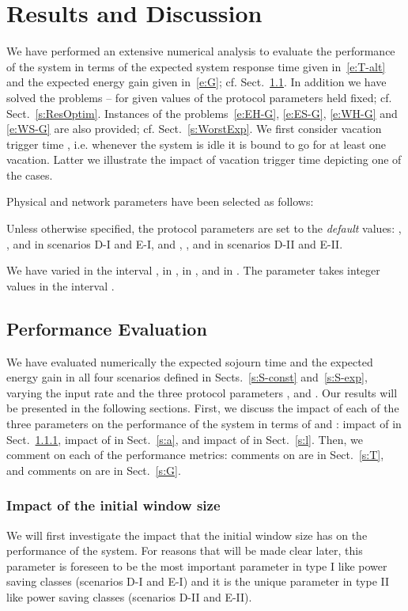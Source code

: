 \documentclass[journal]{IEEEtran}
\begin{document}
\section{Results and Discussion}
\label{s:res}
We have performed an extensive numerical analysis to evaluate the performance of the system in terms of the expected system response time  given in~\eqref{e:T-alt} and the expected energy gain  given in~\eqref{e:G}; cf. Sect.~\ref{s:ResPeva}. In addition we have solved the problems -- for given values of the protocol parameters held fixed; cf. Sect.~\ref{s:ResOptim}. Instances of the problems~\eqref{e:EH-G}, \eqref{e:ES-G}, \eqref{e:WH-G} and \eqref{e:WS-G} are also provided; cf. Sect.~\ref{s:WorstExp}. We first consider vacation trigger time , i.e. whenever the system is idle it is bound to go for at least one vacation. Latter we illustrate the impact of vacation trigger time depicting one of the cases.

Physical and network parameters have been selected as follows:

Unless otherwise specified, the protocol parameters are set to the
{\em default} values: , ,  and  in scenarios D-I and
E-I, and , ,  and  in scenarios D-II and E-II.

We have varied  in the interval ,  in , 
in , and  in . The parameter  takes integer values in the interval .
\subsection{Performance Evaluation}
\label{s:ResPeva}
We have evaluated numerically the expected sojourn time  and the expected energy gain  in all four scenarios defined in Sects.~\ref{s:S-const} and~\ref{s:S-exp}, varying the input rate  and the three protocol parameters ,  and . Our results will be presented in the following sections. First, we discuss the impact of each of the three parameters on the performance of the system in terms of  and : impact of  in Sect.~\ref{s:Tmin}, impact of  in Sect.~\ref{s:a}, and impact of
 in Sect.~\ref{s:l}. Then, we comment on each of the performance metrics: comments on  are in Sect.~\ref{s:T}, and comments on  are in Sect.~\ref{s:G}.
\subsubsection{Impact of the initial window size }
\label{s:Tmin}
We will first investigate the impact that the initial window size  has on the performance of the system. For reasons that will be made clear later, this parameter is foreseen to be the most important parameter in type I like power saving classes (scenarios D-I and E-I) and it is the unique parameter in type II like power saving classes (scenarios D-II and E-II).
\end{document}
